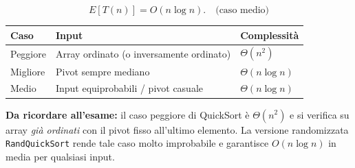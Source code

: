 \begin{teorema}
	\[
	E[T(n)] = O(n \log n). \quad \text{(caso medio)}
	\]
\end{teorema}

\begin{center}
	\begin{tabular}{lll}
		\toprule
		\textbf{Caso} & \textbf{Input} & \textbf{Complessità} \\
		\midrule
		Peggiore & Array ordinato (o inversamente ordinato) & $\Theta(n^2)$ \\
		Migliore & Pivot sempre mediano & $\Theta(n \log n)$ \\
		Medio    & Input equiprobabili / pivot casuale       & $\Theta(n \log n)$ \\
		\bottomrule
	\end{tabular}
\end{center}

\begin{hardnote}
	\textbf{Da ricordare all'esame:} il caso peggiore di QuickSort è
	$\Theta(n^2)$ e si verifica su array \emph{già ordinati} con il pivot
	fisso all'ultimo elemento. La versione randomizzata
	\texttt{RandQuickSort} rende tale caso molto improbabile e garantisce
	$O(n \log n)$ in media per qualsiasi input.
\end{hardnote}

